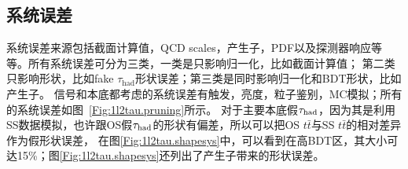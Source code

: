 \subsection{系统误差}\label{sec:1l2tau_sys}
\ltwotau 系统误差来源包括截面计算值，QCD scales，产生子，PDF以及探测器响应等等。所有系统误差可分为三类，一类是只影响归一化，比如截面计算值；
第二类只影响形状，比如fake $\tau_{\text{had}}$形状误差；第三类是同时影响归一化和BDT形状，比如产生子。
信号和本底都考虑的系统误差有触发，亮度，粒子鉴别，MC模拟；所有的系统误差如图~\ref{Fig:1l2tau.pruning}所示。
对于主要本底假$\tau_{\text{had}}$，因为其是利用SS数据模拟，也许跟OS假$\tau_{\text{had}}$的形状有偏差，所以可以把OS $t\bar{t}$与SS $t\bar{t}$的相对差异作为假\tauhad 形状误差，
在图\ref{Fig:1l2tau.shapesys}中，可以看到在高BDT区，其大小可达15\%；图\ref{Fig:1l2tau.shapesys}还列出了产生子带来的形状误差。

